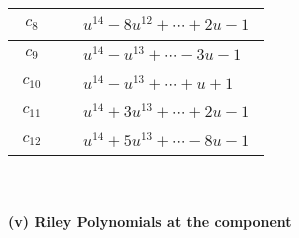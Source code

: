 \documentclass[1p]{elsarticle_modified}
\theoremstyle{definition}
\begin{document}
\begin{tabular}{m{50pt}|m{274pt}}
\hline $$\begin{aligned}c_{8}\end{aligned}$$&$\begin{aligned}
&u^{14}-8 u^{12}+\cdots+2 u-1
\end{aligned}$\\
\hline $$\begin{aligned}c_{9}\end{aligned}$$&$\begin{aligned}
&u^{14}- u^{13}+\cdots-3 u-1
\end{aligned}$\\
\hline $$\begin{aligned}c_{10}\end{aligned}$$&$\begin{aligned}
&u^{14}- u^{13}+\cdots+u+1
\end{aligned}$\\
\hline $$\begin{aligned}c_{11}\end{aligned}$$&$\begin{aligned}
&u^{14}+3 u^{13}+\cdots+2 u-1
\end{aligned}$\\
\hline $$\begin{aligned}c_{12}\end{aligned}$$&$\begin{aligned}
&u^{14}+5 u^{13}+\cdots-8 u-1
\end{aligned}$\\
\hline
\end{tabular}\\~\\
\newpage\renewcommand{\arraystretch}{1}
\flushleft \textbf{(v) Riley Polynomials at the component}\newline \\
\end{document}

